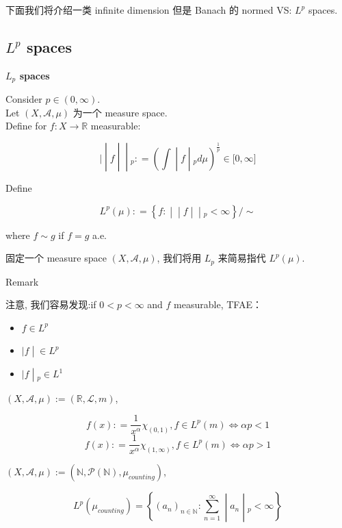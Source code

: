 \documentclass{qlnotes-export}
\begin{document}
下面我们将介绍一类 infinite dimension 但是 Banach 的 normed VS: \(L^{p}\) spaces.

\subsection{\texorpdfstring{\(L^{p}\) spaces}{L\^{}\{p\} spaces}}\label{lp-spaces}

\begin{definition}{\protect{}\label{kn-l-p-spaces}{\textbf{\(L_{p}\) spaces}}}

Consider \(p \in (0,\infty)\).\\
Let \((X,\mathcal{A},\mu)\) 为一个 measure space.\\
Define for \(f:X\rightarrow{\mathbb{R}}\) measurable:

\[\left. | \middle| f \middle| \middle| {}_{p}: = (\int \middle| f \middle| {}_{p} d\mu)^{\frac{1}{p}} \in \lbrack 0,\infty\rbrack \right.\]

Define

\[L^{p}(\mu): = \left\{ f: \middle| \middle| f \middle| \middle| {}_{p} < \infty \right\}/ \sim\]

where \(f \sim g\) if \(f = g\) a.e.

\end{definition}

固定一个 measure space \((X,\mathcal{A},\mu)\), 我们将用 \(L_{p}\) 来简易指代 \(L^{p}(\mu)\).\\

\begin{qlremark}{Remark}

注意, 我们容易发现:if \(0 < p < \infty\) and \(f\) measurable, TFAE：

\begin{itemize}
\item
  \(f \in L^{p}\)
\item
  \(\left. |f \middle| \in L^{p} \right.\)
\item
  \(\left. |f \middle| {}_{p} \in L^{1} \right.\)
\end{itemize}

\end{qlremark}

\begin{example}

\((X,\mathcal{A},\mu) := ({\mathbb{R}},\mathcal{L},m)\),

\[f(x): = \frac{1}{x^{\alpha}}\chi_{(0,1)}, f \in L^{p}(m)\Leftrightarrow\alpha p < 1\]\[f(x): = \frac{1}{x^{\alpha}}\chi_{(1,\infty)}, f \in L^{p}(m)\Leftrightarrow\alpha p > 1\]

\((X,\mathcal{A},\mu) := ({\mathbb{N}},\mathcal{P}({\mathbb{N}}),\mu_{counting})\),

\[L^{p}(\mu_{counting}) = \left\{ (a_{n})_{n \in {\mathbb{N}}}:\sum\limits_{n = 1}^{\infty} \middle| a_{n} \middle| {}_{p} < \infty \right\}\]

\end{example}
\end{document}
